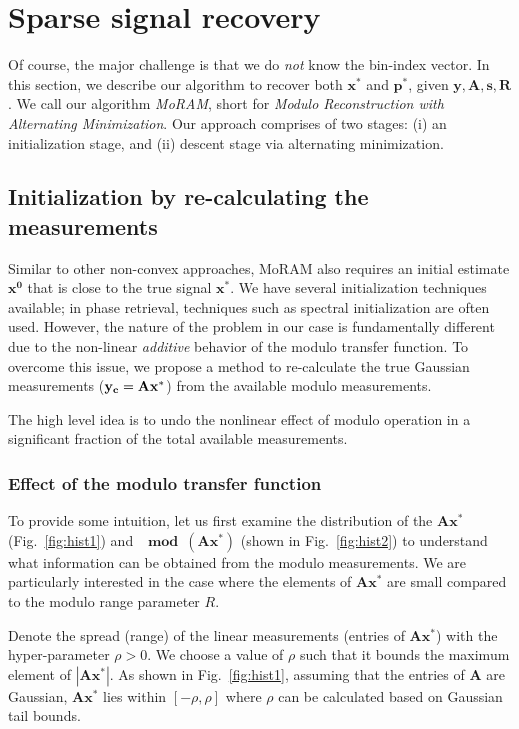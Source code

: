 \section{Sparse signal recovery}
\label{sec:algo}
Of course, the major challenge is that we do \emph{not} know the bin-index vector. In this section, we describe our algorithm to recover both $\mathbf{x^*}$ and $\mathbf{p^*}$, given $\mathbf{y, A, s, R}$.  We call our algorithm \emph{MoRAM}, short for \emph{Modulo Reconstruction with Alternating Minimization}. Our approach comprises of two stages: (i) an initialization stage, and (ii) descent stage via alternating minimization.

\subsection{Initialization by re-calculating the measurements}
\label{sec:init}

Similar to other non-convex approaches, MoRAM also requires an initial estimate $\mathbf{{x}^0}$ that is close to the true signal $\mathbf{{x}^*}$. We have several initialization techniques available; in phase retrieval, techniques such as spectral initialization are often used. However, the nature of the problem in our case is fundamentally different due to the non-linear \emph{additive} behavior of the modulo transfer function. To overcome this issue, we propose a method to re-calculate the true Gaussian measurements ($\mathbf{y_c}= \mathbf{Ax^*}$) from the available modulo measurements. 

The high level idea is to undo the nonlinear effect of modulo operation in a significant fraction of the total available measurements. %

\subsubsection{Effect of the modulo transfer function} 
\label{sec:modeff}
To provide some intuition, let us first examine the distribution of the $\mathbf{Ax^*}$(Fig.~\ref{fig:hist1}) and $\mathbf{\mod(\mathbf{Ax^*})}$ (shown in Fig.~\ref{fig:hist2}) to understand what information can be obtained from the modulo measurements. We are particularly interested in the case where the elements of $\mathbf{Ax^*}$ are small compared to the modulo range parameter $R$. 

Denote the spread (range) of the linear measurements (entries of $\mathbf{Ax^*}$) with the hyper-parameter $\rho > 0$. We choose a value of $\rho$ such that it bounds the maximum element of $|\mathbf{Ax^*}|$. As shown in Fig.~\ref{fig:hist1}, assuming that the entries of $\mathbf{A}$ are Gaussian, $\mathbf{Ax^*}$ lies within $[-\rho, \rho]$ where $\rho$ can be calculated based on Gaussian tail bounds.

